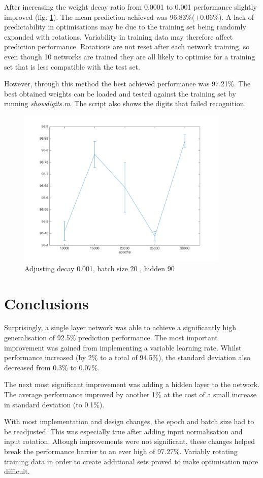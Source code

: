 \documentclass[11]{article}
\begin{document}
After increasing the weight decay ratio from 0.0001 to 0.001 performance slightly improved (fig. \ref{fig:rotations2}). The mean prediction achieved was 96.83\%($\pm 0.06\%$). A lack of predictability in optimisations may be due to the training set being randomly expanded with rotations. Variability in training data may therefore affect prediction performance. Rotations are not reset after each network training, so even though 10 networks are trained they are all likely to optimise for a training set that is less compatible with the test set. 

However, through this method the best achieved performance was 97.21\%. The best obtained weights can be loaded and tested against the training set by running \emph{showdigits.m}. The script also shows the digits that failed recognition. 

\begin{figure}
\centering
\includegraphics[width=0.9\textwidth]{rotations2.png}
\caption{Adjusting decay 0.001, batch size 20 , hidden 90}
\label{fig:rotations2}
\end{figure}

\section{Conclusions}
Surprisingly, a single layer network was able to achieve a significantly high generalisation of 92.5\% prediction performance. The most important improvement was  gained from implementing a variable learning rate. Whilst performance increased (by 2\% to a total of 94.5\%), the standard deviation also decreased from 0.3\% to 0.07\%.

The next most significant improvement was adding a hidden layer to the network. The average performance improved by another 1\% at the cost of a small increase in standard deviation (to 0.1\%).

With most implementation and design changes, the epoch and batch size had to be readjusted. This was especially true after adding input normalisation and input rotation. Altough improvements were not significant, these changes helped break the performance barrier to an ever high of 97.27\%. Variably rotating training data in order to create additional sets proved to make optimisation more difficult. 
\end{document}
